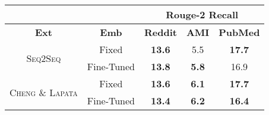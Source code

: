 \begin{tabular}{ccccc}
   & & \multicolumn{3}{c}{\textbf{Rouge-2 Recall}}\\
   \toprule
   \textbf{Ext} & \textbf{Emb}  & 
        \textbf{Reddit} & \textbf{AMI} & \textbf{PubMed} \\
   \midrule
   \multirow{2}{*}{\textsc{Seq2Seq}}
      & Fixed & \textbf{13.6} &         5.5  & \textbf{17.7} \\
      & Fine-Tuned & \textbf{13.8} & \textbf{5.8} &         16.9  \\
   \hline
   \multirow{2}{*}{\textsc{Cheng \& Lapata}} 
      & Fixed & \textbf{13.6} & \textbf{6.1} & \textbf{17.7} \\
      & Fine-Tuned & \textbf{13.4} & \textbf{6.2} & \textbf{16.4} \\
   \bottomrule
  \end{tabular}

